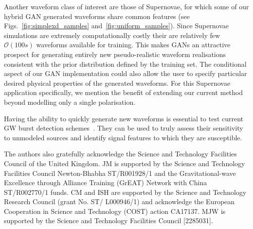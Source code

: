 \documentclass[12pt]{iopart}
\begin{document}
% 
Another waveform class of interest are those of Supernovae, for which some of our hybrid \ac{GAN} generated waveforms share common features (see Figs.~\ref{fig:simplexd_samples} and~\ref{fig:uniform_samples}). Since Supernovae simulations are extremely computationally costly their are relatively few $\mathcal{O}(100s)$ waveforms available for training. This makes \acp{GAN} an attractive prospect for generating entirely new pseudo-realistic waveform realisations consistent with the prior distribution defined by the training set. The conditional aspect of our \ac{GAN} implementation could also allow the user to specify particular desired physical properties of the generated waveforms. For this Supernovae application specifically, we mention the benefit of extending our current method beyond modelling only a single polarisation.  

%
Having the ability to quickly generate new waveforms is essential to test current GW burst detection schemes~\cite{drago2020coherent,Klimenko_2008, Aso_2008}. They can be used to truly assess their sensitivity to unmodeled sources and identify signal features to which they are susceptible. 

\ack

The authors also gratefully acknowledge the Science and Technology Facilities Council of the United Kingdom. JM is supported by the Science and Technology Facilities Council Newton-Bhabha ST/R001928/1 and the Gravitational-wave Excellence through Alliance Training (GrEAT) Network with China ST/R002770/1 funds. CM and ISH are supported by the Science and Technology Research Council (grant No. ST/ L000946/1) and acknowledge the European Cooperation in Science and Technology (COST) action CA17137. MJW is supported by the Science and Technology Facilities Council [2285031].
\end{document}
